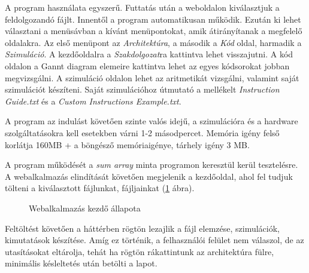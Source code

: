 
A program használata egyszerű. Futtatás után a weboldalon kiválasztjuk a feldolgozandó fájlt. Innentől a program automatikusan működik. Ezután ki lehet választani a menüsávban a kívánt menüpontokat, amik átirányítanak a megfelelő oldalakra. Az első menüpont az \textit{Architektúra}, a második a \textit{Kód} oldal, harmadik a \textit{Szimuláció}. A kezdőoldalra a \textit{Szakdolgozat}ra kattintva lehet visszajutni. A kód oldalon a Gannt diagram elemeire kattintva lehet az egyes kódsorokat jobban megvizsgálni. A szimuláció oldalon lehet az aritmetikát vizsgálni, valamint saját szimulációt készíteni. Saját szimulációhoz útmutató a mellékelt \textit{Instruction Guide.txt} és a \textit{Custom Instructions Example.txt}.

A program az indulást követően szinte valós idejű, a szimulációra és a hardware szolgáltatásokra kell esetekben várni 1-2 másodpercet. Memória igény felső korlátja 160MB + a böngésző memóriaigénye, tárhely igény 3 MB.

A program működését a \textit{sum array} minta programon keresztül kerül tesztelésre. A webalkalmazás elindítását követően megjelenik a kezdőoldal, ahol fel tudjuk tölteni a kiválasztott fájlunkat, fájljainkat (\ref{fig:start} ábra).

\begin{figure}[h]
\centering
{}
\caption{Webalkalmazás kezdő állapota}
\label{fig:start}
\end{figure}

\newpage
Feltöltést követően a háttérben rögtön lezajlik a fájl elemzése, szimulációk, kimutatások készítése. Amíg ez történik, a felhasználói felület nem válaszol, de az utasításokat eltárolja, tehát ha rögtön rákattintunk az architektúra fülre, minimális késleltetés után betölti a lapot.

